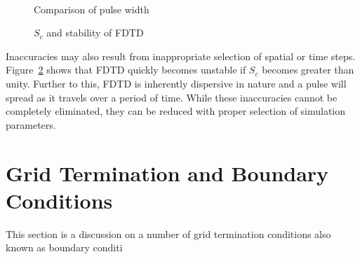 \begin{figure}[H]
\centering
\mbox{\quad{}}\\
\mbox{\quad{}}
\caption{Comparison of pulse width}
\label{Pulsewidth-comparison}
\end{figure}
\begin{figure}[H]
\centering
\mbox{\quad{}}
\caption{$S_c$ and stability of FDTD}
\label{Unstable-FDTD}
\end{figure}
Inaccuracies may also result from inappropriate selection of spatial or time steps. Figure~\ref{Unstable-FDTD} shows that FDTD quickly becomes unstable if $S_c$ becomes greater than unity. Further to this, FDTD is inherently dispersive in nature and a pulse will spread as it travels over a period of time. While these inaccuracies cannot be completely eliminated, they can be reduced with proper selection of simulation parameters.
\section{Grid Termination and Boundary Conditions}
This section is a discussion on a number of grid termination conditions also known as boundary conditi